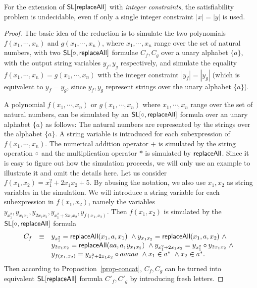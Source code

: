 \begin{theorem}\label{thm-ext-int}
	For the extension of $\mathsf{SL}[\mathsf{replaceAll}]$ with \emph{integer constraints}, the satisfiability problem is undecidable, even if only a single integer constraint $|x| = |y|$ is used.
\end{theorem}

\begin{proof}
The basic idea of the reduction is to simulate the two polynomials $f(x_1,\cdots, x_n)$ and $g(x_1,\cdots, x_n)$, where $x_1,\cdots,x_n$ range over the set of natural numbers, with two $\mathsf{SL}[\circ,\mathsf{replaceAll}]$ formulae $C_f, C_g$ over a unary alphabet $\{a\}$, with the output string variables $y_f, y_g$ respectively, and simulate the equality $f(x_1,\cdots, x_n) = g(x_1,\cdots, x_n)$ with the integer constraint $|y_f|=|y_g|$ (which is equivalent to $y_f = y_g$, since $y_f, y_g$ represent strings over the unary alphabet $\{a\}$). 

A polynomial $f(x_1,\cdots, x_n)$ or $g(x_1,\cdots, x_n)$ where $x_1, \cdots, x_n$ range over the set of natural numbers, can be simulated by an $\mathsf{SL}[\circ,\mathsf{replaceAll}]$ formula over an unary alphabet $\{a\}$ as follows: The natural numbers are represented by the strings over the alphabet $\{a\}$. A string variable is introduced for each subexpression of $f(x_1,\cdots, x_n)$. The numerical addition operator $+$ is simulated by the string operation $\circ$ 
and the multiplication operator $*$ is simulated by $\mathsf{replaceAll}$. Since it is easy to figure out how the simulation proceeds, we will only use an example to illustrate it and omit the details here. Let us consider $f(x_1,x_2) = x_1^2 + 2 x_1 x_2 + 5$. By abusing the notation, we also use $x_1,x_2$ as string variables in the simulation. We will introduce a string variable for each subexpression in $f(x_1,x_2)$, namely the variables $y_{x_1^2}, y_{x_1x_2}, y_{2x_1x_2}, y_{x_1^2+2x_1x_2}, y_{f(x_1,x_2)}$. Then $f(x_1,x_2)$ is simulated by the $\mathsf{SL}[\circ,\mathsf{replaceAll}]$ formula
\[
\begin{array} {l c l }
C_f & \equiv & y_{x_1^2} = \mathsf{replaceAll}(x_1,a, x_1)\ \wedge y_{x_1x_2} = \mathsf{replaceAll}(x_1, a, x_2)\ \wedge \\
& & y_{2x_1x_2} = \mathsf{replaceAll}(aa, a, y_{x_1x_2})\ \wedge y_{x_1^2+2x_1x_2} = y_{x_1^2} \circ y_{2x_1x_2}\ \wedge  \\
& & y_{f(x_1,x_2)}=y_{x_1^2+2x_1x_2} \circ a a a a a\ \wedge x_1 \in a^*\ \wedge x_2 \in a^*.
\end{array}
\]
Then according to Proposition~\ref{prop-concat}, $C_f, C_g$ can be turned into equivalent $\mathsf{SL}[\mathsf{replaceAll}]$ formula $C'_f, C'_g$ by introducing fresh letters.
 

\end{proof}
